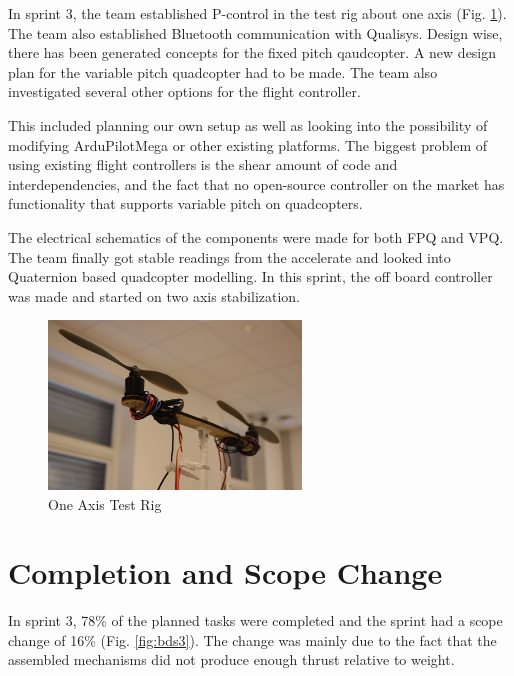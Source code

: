 In sprint 3, the team established P-control in the test rig about one axis (Fig. \ref{fig:oneaxis}). The team also established Bluetooth communication with Qualisys. Design wise, there has been generated concepts for the fixed pitch qaudcopter. A new design plan for the variable pitch quadcopter had to be made. The team also investigated several other options for the flight controller. \bigskip

This included planning our own setup as well as looking into the possibility of modifying ArduPilotMega or other existing platforms. The biggest problem of using existing flight controllers is the shear amount of code and interdependencies, and the fact that no open-source controller on the market has functionality that supports variable pitch on quadcopters. \bigskip

The electrical schematics of the components were made for both FPQ and VPQ. The team finally got stable readings from the accelerate and looked into Quaternion based quadcopter modelling. In this sprint, the off board controller was made and started on two axis stabilization. \bigskip

\begin{figure}[h]
        \centering
        \includegraphics[width = 0.6\textwidth]{VAPIQ-PICTURES/oneaxis}
        \caption{One Axis Test Rig}
        \label{fig:oneaxis}
\end{figure}
  

\newpage
\section{Completion and Scope Change}

In sprint 3, 78\% of the planned tasks were completed and the sprint had a scope change of 16\% (Fig. \ref{fig:bds3}). The change was mainly due to the fact that the assembled mechanisms did not produce enough thrust relative to weight. \\

